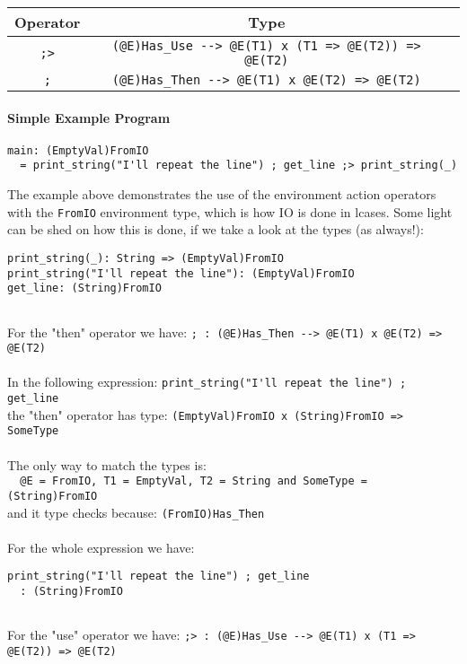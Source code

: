 \documentclass{article}
\begin{document}
\begin{center}
\begin{tabular}{ |c|c|c| }
\hline
Operator & Type
\\
\hline
\hline
\verb|;>| & \verb|(@E)Has_Use --> @E(T1) x (T1 => @E(T2)) => @E(T2)|
\\
\hline
\verb|;| & \verb|(@E)Has_Then --> @E(T1) x @E(T2) => @E(T2)|
\\
\hline
\end{tabular}
\end{center}

\paragraph{Simple Example Program}
\begin{verbatim}
main: (EmptyVal)FromIO
  = print_string("I'll repeat the line") ; get_line ;> print_string(_)
\end{verbatim}
The example above demonstrates the use of the environment action operators with
the \verb|FromIO| environment type, which is how IO is done in lcases. Some
light can be shed on how this is done, if we take a look at the types (as
always!):
\begin{verbatim}
print_string(_): String => (EmptyVal)FromIO
print_string("I'll repeat the line"): (EmptyVal)FromIO
get_line: (String)FromIO


\end{verbatim}
For the "then" operator we have:
\verb|; : (@E)Has_Then --> @E(T1) x @E(T2) => @E(T2)|
\\\\
In the following expression:
\verb|print_string("I'll repeat the line") ; get_line|
\\
the "then" operator has type:
\verb|(EmptyVal)FromIO x (String)FromIO => SomeType|
\\\\
The only way to match the types is:
\\
\verb|  @E = FromIO, T1 = EmptyVal, T2 = String and SomeType = (String)FromIO|
\\
and it type checks because: \verb|(FromIO)Has_Then|
\\\\
For the whole expression we have:
\begin{verbatim}
print_string("I'll repeat the line") ; get_line
  : (String)FromIO


\end{verbatim}
For the "use" operator we have:
\verb|;> : (@E)Has_Use --> @E(T1) x (T1 => @E(T2)) => @E(T2)|
\end{document}
